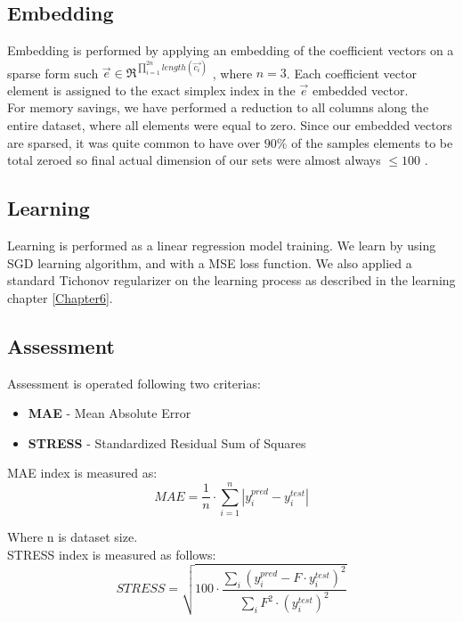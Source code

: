 \subsection{Embedding}
Embedding is performed by applying an embedding of the coefficient vectors on a sparse form such $\overrightarrow{e} \in \Re^{\prod_{i=1}^{2n}{length(\overrightarrow{c_i})}}$ , where $n = 3$.
Each coefficient vector element is assigned to the exact simplex index in the $\overrightarrow{e}$ embedded vector.
\\
For memory savings, we have performed a reduction to all columns along the entire dataset, where all elements were equal to zero.
Since our embedded vectors are sparsed, it was quite common to have over $90 \% $ of the samples elements to be total zeroed so final actual dimension of our sets were almost always $ \le 100$ .

\subsection{Learning}
Learning is performed as a linear regression model training.
We learn by using SGD \cite{SGD} learning algorithm, and with a MSE \cite{MSE} loss function.
We also applied a standard Tichonov \cite{Tichonov} regularizer on the learning process as described in the learning chapter \ref{Chapter6}.


\subsection{Assessment}
Assessment is operated following two criterias:
\begin{itemize}
\item \textbf{MAE} - Mean Absolute Error
\item \textbf{STRESS} - Standardized Residual Sum of Squares \cite{STRESS} \\
\end{itemize}

MAE index is measured as:
\begin{equation}
MAE = \frac{1}{n} \cdot \sum_{i = 1}^{n}{|y^{pred}_i - y^{test}_i|}
\end{equation}

Where n is dataset size. \\

STRESS index is measured as follows:
\begin{equation}
STRESS = \sqrt{100 \cdot \dfrac{\sum_{i}{(y^{pred}_i - F \cdot y^{test}_i)^2}}{\sum_{i}{F^2 \cdot (y^{test}_i)^2 }}}
\end{equation}

